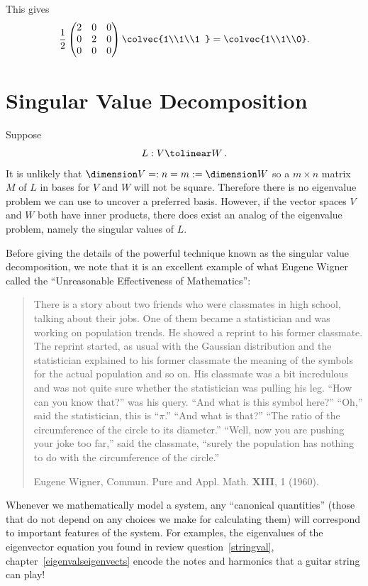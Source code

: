 \begin{example}
This gives 
\[\frac12 \begin{pmatrix}
 2 & 0 &0 \\
0 & 2  &0\\
0 & 0 &0
\end{pmatrix}
\colvec{1\\1\\1 } = \colvec{1\\1\\0} .\]
\end{example}



\section{Singular Value Decomposition}

Suppose 
\[
L:V\tolinear W\, .
\]
It is unlikely that $\dimension V=:n=m:=\dimension W$ so a $m\times n$ matrix $M$ of $L$ in bases for $V$ and $W$ will not be square.
Therefore there is no eigenvalue problem  we can use to uncover a preferred basis. However, if the vector spaces $V$ and 
$W$ both have inner products, there does exist an analog of the eigenvalue problem, namely the singular values of $L$.

Before giving the details of the powerful technique known as the singular value decomposition, we note that it is an 
excellent example of what Eugene Wigner called the ``Unreasonable Effectiveness of Mathematics'':
\begin{quote}{\scriptsize
There is a story about two friends who were classmates in high school, talking about their jobs. One of them became a statistician
and was working on population trends. He showed a reprint to his former classmate.
The reprint started, as usual with the Gaussian distribution and the statistician explained
to his former classmate the meaning of the symbols for the actual population and so on. His classmate
was a bit incredulous and was not quite sure whether the statistician was pulling his leg. ``How can you 
know that?'' was his query. ``And what is this symbol here?'' ``Oh,'' said the statistician, this is ``$\pi$.''
``And what is that?'' ``The ratio of the circumference of the circle to its diameter.'' ``Well, now
you are pushing your joke too far,'' said the classmate, ``surely the population has nothing to do with the 
circumference of the circle.''


Eugene Wigner, Commun. Pure and Appl. Math. {\bfseries XIII}, 1 (1960).
}
\end{quote}
Whenever we mathematically model a system, any ``canonical quantities'' 
(those that  %
do not
depend on any choices we make for calculating them) will correspond to important features of the system. For examples, the eigenvalues
of the eigenvector equation you found in review question~\ref{stringval}, chapter~\ref{eigenvalseigenvects} encode the notes and harmonics that a guitar string can play! 

